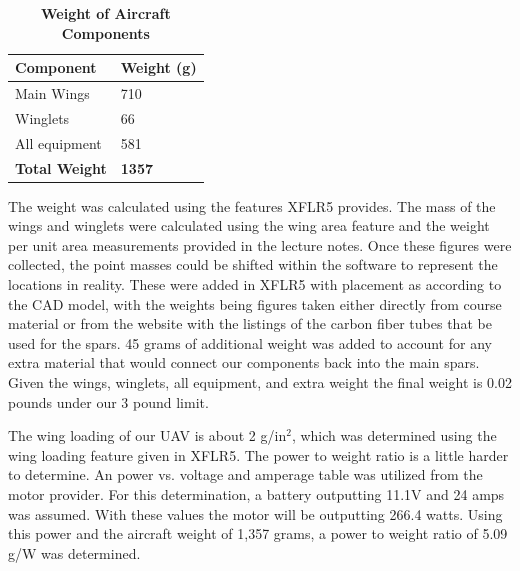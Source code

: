     \begin{table}[H]
        \begin{center}
        \caption{\textbf{Weight of Aircraft Components}} \label{table:Weights}
        \begin{tabular}{|p{1in}|p{1in}|} %
        \hline
            \textbf{Component} & \textbf{Weight (g)} \\ \hline
            Main Wings & 710 \\ \hline
            Winglets & 66 \\ \hline
            All equipment & 581 \\ \hline
            \textbf{Total Weight} & \textbf{1357} \\ \hline
        \end{tabular}
        \end{center}
    \end{table}

    The weight was calculated using the features XFLR5 provides. The mass of the wings and winglets were calculated using the wing area feature and the weight per unit area measurements provided in the lecture notes. Once these figures were collected, the point masses could be shifted within the software to represent the locations in reality. These were added in XFLR5 with placement as according to the CAD model, with the weights being figures taken either directly from course material or from the website with the listings of the carbon fiber tubes that be used for the spars. 45 grams of additional weight was added to account for any extra material that would connect our components back into the main spars. Given the wings, winglets, all equipment, and extra weight the final weight is 0.02 pounds under our 3 pound limit. 
    
    The wing loading of our UAV is about 2 g/in$^2$, which was determined using the wing loading feature given in XFLR5. The power to weight ratio is a little harder to determine. An power vs. voltage and amperage table was utilized from the motor provider. For this determination, a battery outputting 11.1V and 24 amps was assumed. With these values the motor will be outputting 266.4 watts. Using this power and the aircraft weight of 1,357 grams, a power to weight ratio of 5.09 g/W was determined.



